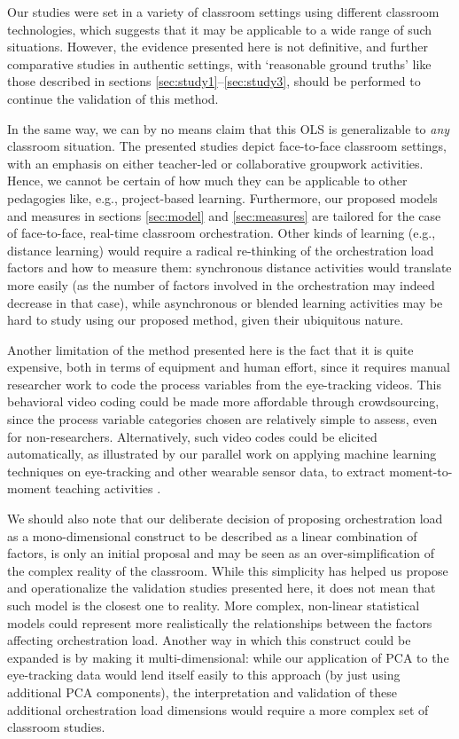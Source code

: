 \documentclass[10pt,journal,compsoc]{IEEEtran}
\begin{document}
Our studies were set in a variety of classroom settings using different classroom technologies, which suggests that it may be applicable to a wide range of such situations. However, the evidence presented here is not definitive, and further comparative studies in authentic settings, with `reasonable ground truths' like those described in sections \ref{sec:study1}--\ref{sec:study3}, should be performed to continue the validation of this method.

In the same way, we can by no means claim that this OLS is generalizable to \textit{any} classroom situation. The presented studies depict face-to-face classroom settings, with an emphasis on either teacher-led or collaborative groupwork activities. Hence, we cannot be certain of how much they can be applicable to other pedagogies like, e.g., project-based learning. Furthermore, our proposed models and measures in sections \ref{sec:model} and \ref{sec:measures} are tailored for the case of face-to-face, real-time classroom orchestration. Other kinds of learning (e.g., distance learning) would require a radical re-thinking of the orchestration load factors and how to measure them: synchronous distance activities would translate more easily (as the number of factors involved in the orchestration may indeed decrease in that case), while asynchronous or blended learning activities may be hard to study using our proposed method, given their ubiquitous nature.

Another limitation of the method presented here is the fact that it is quite expensive, both in terms of equipment and human effort, since it requires manual researcher work to code the process variables from the eye-tracking videos. This behavioral video coding could be made more affordable through crowdsourcing, since the process variable categories chosen are relatively simple to assess, even for non-researchers. Alternatively, such video codes could be elicited automatically, as illustrated by our parallel work on applying machine learning techniques on eye-tracking and other wearable sensor data, to extract moment-to-moment teaching activities \cite{prieto2016teaching}.

We should also note that our deliberate decision of proposing orchestration load as a mono-dimensional construct to be described as a linear combination of factors, is only an initial proposal and may be seen as an over-simplification of the complex reality of the classroom. While this simplicity has helped us propose and operationalize the validation studies presented here, it does not mean that such model is the closest one to reality. More complex, non-linear statistical models could represent more realistically the relationships between the factors affecting orchestration load. Another way in which this construct could be expanded is by making it multi-dimensional: while our application of PCA to the eye-tracking data would lend itself easily to this approach (by just using additional PCA components), the interpretation and validation of these additional orchestration load dimensions would require a more complex set of classroom studies.
\end{document}
